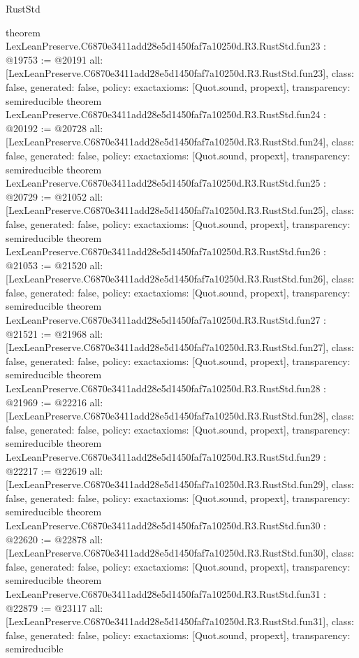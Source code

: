 \begin{lexlean}{RustStd}
\begin{coremodule}
{}
theorem LexLeanPreserve.C6870e3411add28e5d1450faf7a10250d.R3.RustStd.fun23 : @19753 := @20191 {
  all: [LexLeanPreserve.C6870e3411add28e5d1450faf7a10250d.R3.RustStd.fun23],
  class: false,
  generated: false,
  policy: exact{axioms: [Quot.sound, propext]},
  transparency: semireducible
}
theorem LexLeanPreserve.C6870e3411add28e5d1450faf7a10250d.R3.RustStd.fun24 : @20192 := @20728 {
  all: [LexLeanPreserve.C6870e3411add28e5d1450faf7a10250d.R3.RustStd.fun24],
  class: false,
  generated: false,
  policy: exact{axioms: [Quot.sound, propext]},
  transparency: semireducible
}
theorem LexLeanPreserve.C6870e3411add28e5d1450faf7a10250d.R3.RustStd.fun25 : @20729 := @21052 {
  all: [LexLeanPreserve.C6870e3411add28e5d1450faf7a10250d.R3.RustStd.fun25],
  class: false,
  generated: false,
  policy: exact{axioms: [Quot.sound, propext]},
  transparency: semireducible
}
theorem LexLeanPreserve.C6870e3411add28e5d1450faf7a10250d.R3.RustStd.fun26 : @21053 := @21520 {
  all: [LexLeanPreserve.C6870e3411add28e5d1450faf7a10250d.R3.RustStd.fun26],
  class: false,
  generated: false,
  policy: exact{axioms: [Quot.sound, propext]},
  transparency: semireducible
}
theorem LexLeanPreserve.C6870e3411add28e5d1450faf7a10250d.R3.RustStd.fun27 : @21521 := @21968 {
  all: [LexLeanPreserve.C6870e3411add28e5d1450faf7a10250d.R3.RustStd.fun27],
  class: false,
  generated: false,
  policy: exact{axioms: [Quot.sound, propext]},
  transparency: semireducible
}
theorem LexLeanPreserve.C6870e3411add28e5d1450faf7a10250d.R3.RustStd.fun28 : @21969 := @22216 {
  all: [LexLeanPreserve.C6870e3411add28e5d1450faf7a10250d.R3.RustStd.fun28],
  class: false,
  generated: false,
  policy: exact{axioms: [Quot.sound, propext]},
  transparency: semireducible
}
theorem LexLeanPreserve.C6870e3411add28e5d1450faf7a10250d.R3.RustStd.fun29 : @22217 := @22619 {
  all: [LexLeanPreserve.C6870e3411add28e5d1450faf7a10250d.R3.RustStd.fun29],
  class: false,
  generated: false,
  policy: exact{axioms: [Quot.sound, propext]},
  transparency: semireducible
}
theorem LexLeanPreserve.C6870e3411add28e5d1450faf7a10250d.R3.RustStd.fun30 : @22620 := @22878 {
  all: [LexLeanPreserve.C6870e3411add28e5d1450faf7a10250d.R3.RustStd.fun30],
  class: false,
  generated: false,
  policy: exact{axioms: [Quot.sound, propext]},
  transparency: semireducible
}
theorem LexLeanPreserve.C6870e3411add28e5d1450faf7a10250d.R3.RustStd.fun31 : @22879 := @23117 {
  all: [LexLeanPreserve.C6870e3411add28e5d1450faf7a10250d.R3.RustStd.fun31],
  class: false,
  generated: false,
  policy: exact{axioms: [Quot.sound, propext]},
  transparency: semireducible
}
\end{coremodule}
\end{lexlean}
